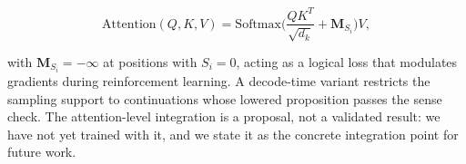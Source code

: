 \documentclass{article}
\begin{document}
\[\text{Attention}(Q, K, V) = \text{Softmax}\Big(\frac{QK^T}{\sqrt{d_k}} + \mathbf{M}_{S_i}\Big) V,\]

with \(\mathbf{M}_{S_i} = -\infty\) at positions with \(S_i = 0\),
acting as a logical loss that modulates gradients during reinforcement
learning. A decode-time variant restricts the sampling support to
continuations whose lowered proposition passes the sense check. The
attention-level integration is a proposal, not a validated result: we
have not yet trained with it, and we state it as the concrete
integration point for future work.
\end{document}
